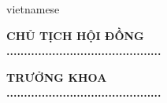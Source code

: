 \begin{titlepage}
\begin{otherlanguage*}{vietnamese}
\begin{center}
{\begin{minipage}[t]{1.0\textwidth}
\begin{center}
	\begin{minipage}[t]{0.48\textwidth}
		\begin{center}
			\textbf{CHỦ TỊCH HỘI ĐỒNG}\\
			\vspace{3cm}
			\textbf{............................................}\\
			\vspace{5mm}
		\end{center}
	\end{minipage}
	\noindent
	\begin{minipage}[t]{0.48\textwidth}
		\begin{center}
			\textbf{TRƯỞNG KHOA}\\
			\vspace{3cm}
			\textbf{............................................}\\
			\vspace{5mm}
		\end{center}
	\end{minipage}

	\end{center}
	\end{minipage}
}

\end{center}
\end{otherlanguage*}

\vfill
\end{titlepage}

